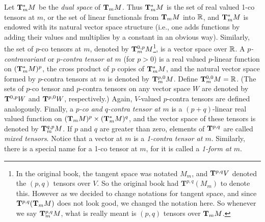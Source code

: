 \documentclass[../main]{subfiles}
\begin{document}
Let $\cotangentspace{M}{m}$ be the \emph{dual space} of $\tangentspace{M}{m}$. Thus $\cotangentspace{M}{m}$ is the set of real valued 1-co tensors at $m$, or the set of linear functionals from $\tangentspace{M}{m}$ into $\bR$, and $\cotangentspace{M}{m}$ is endowed with its natural vector space structure (i.e., one adds functions by adding their values and multiplies by a constant in an obvious way). Similarly, the set of $p$-co tensors at $m$, denoted by $\tensorspace{M}{m}{0}{p}$\footnote{In the original book, the tangent space was notated $M_m$, and $\tensorbundle{V}{p}{q}$ denoted the $(p,q)$ tensors over $V$. So the original book had $\mathbf T^{p,q}(M_m)$ to denote this. However as we decided to change notations for tangent space, and since $\mathbf{T}^{p,q}(\tangentspace{M}{m})$ does not look good, we changed the notation here. So whenever we say $\tensorspace{M}{m}{p}{q}$, what is really meant is $(p,q)$ tensors over $\tangentspace{M}{m}$. }, is a vector space over $\bR$. A \emph{$p$-contravariant} or \emph{$p$-contra tensor at $m$} (for $p>0$) is a real valued $p$-linear function on $(\cotangentspace{M}{m})^p$, the cross product of $p$ copies of $\cotangentspace{M}{m}$, and the natural vector space formed by $p$-contra tensors at $m$ is denoted by $\tensorspace{M}{m}{p}{0}$. Define $\tensorspace{M}{m}{0}{0} = \bR$. (The sets of $p$-co tensor and $p$-contra tensors on any vector space $W$ are denoted by $\tensorbundle{W}{0}{p}$ and $\tensorbundle{W}{p}{0}$, respectively.) Again, $V$-valued $p$-contra tensors are defined analogously. Finally, a \emph{$p$-co and $q$-contra tensor at $m$} is a $(p+q)$-linear real valued function on $(\tangentspace{M}{m})^p \times (\cotangentspace{M}{m})^q$, and the vector space of these tensors is denoted by $\tensorspace{M}{m}{q}{p}$. If $p$ and $q$ are greater than zero, elements of $\tensorbundle{}{p}{q}$ are called \emph{mixed tensors}. Notice that a vector at $m$ is a \emph{1-contra tensor at $m$}. Similarly, there is a special name for a 1-co tensor at $m$, for it is called a \emph{1-form at $m$}.
\end{document}
